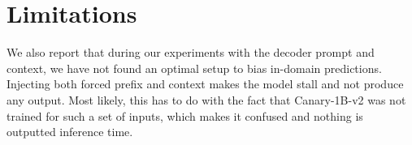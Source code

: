 \documentclass[11pt]{article}
\begin{document}
\section*{Limitations}
We also report that during our experiments with the decoder prompt and context, we have not found an optimal setup to bias in-domain predictions. Injecting both forced prefix and context makes the model stall and not produce any output. Most likely, this has to do with the fact that Canary-1B-v2 was not trained for such a set of inputs, which makes it confused and nothing is outputted inference time.





%



\appendix


\end{document}
